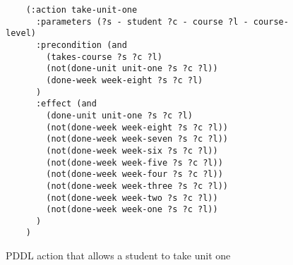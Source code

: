\begin{figure}[t]
    \begin{lstlisting}
    (:action take-unit-one
      :parameters (?s - student ?c - course ?l - course-level)
      :precondition (and 
        (takes-course ?s ?c ?l)
        (not(done-unit unit-one ?s ?c ?l))
        (done-week week-eight ?s ?c ?l)
      )
      :effect (and
        (done-unit unit-one ?s ?c ?l)
        (not(done-week week-eight ?s ?c ?l))
        (not(done-week week-seven ?s ?c ?l))
        (not(done-week week-six ?s ?c ?l))
        (not(done-week week-five ?s ?c ?l))
        (not(done-week week-four ?s ?c ?l))
        (not(done-week week-three ?s ?c ?l))
        (not(done-week week-two ?s ?c ?l))
        (not(done-week week-one ?s ?c ?l))
      )
    )
    \end{lstlisting}
    \caption{PDDL action that allows a student to take unit one}\label{fig:take-unit-one}
\end{figure}